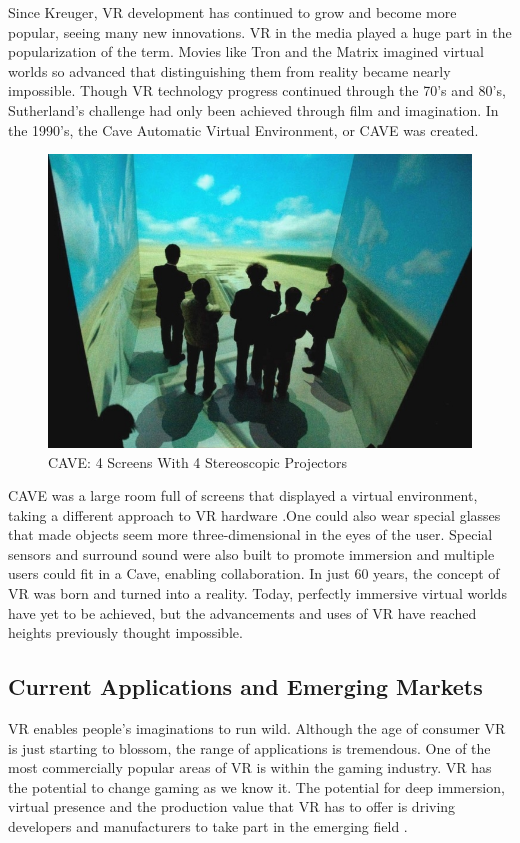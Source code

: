\documentclass[12pt]{article}
\begin{document}
Since Kreuger, VR development has continued to grow and become more popular, seeing many new innovations. VR in the media played a huge part in the popularization of the term. Movies like Tron and the Matrix imagined virtual worlds so advanced that distinguishing them from reality became nearly impossible. Though VR technology progress  continued through the 70's and 80's, Sutherland's challenge had only been achieved through film and imagination. 
In the 1990's, the Cave Automatic Virtual Environment, or CAVE was created. 
 \begin{figure}[h]
    \centering
 \includegraphics[width=.55\textwidth]{photo16_cave}
  \caption{CAVE: 4 Screens With 4 Stereoscopic Projectors \cite{CAVE}}
  \label{fig:cave}
 \end{figure}
CAVE was a large room full of screens that displayed a virtual environment, taking a different approach to VR hardware \cite{mihelj}.One could also wear special glasses that made objects seem more three-dimensional in the eyes of the user. Special sensors and surround sound were also built to promote immersion and multiple users could fit in a Cave, enabling collaboration. In just 60 years, the concept of VR was born and turned into a reality. Today, perfectly immersive virtual worlds have yet to be achieved, but the advancements and uses of VR have reached heights previously thought impossible. 


  
\subsection{Current Applications and Emerging Markets}
VR enables people's imaginations to run wild. Although the age of consumer VR is just starting to blossom, the range of applications is tremendous. One of the most commercially popular areas of VR is within the gaming industry. VR has the potential to change gaming as we know it. The potential for deep immersion, virtual presence and the production value that VR has to offer is driving developers and manufacturers to take part in the emerging field \cite{parisi}.   
\end{document}
